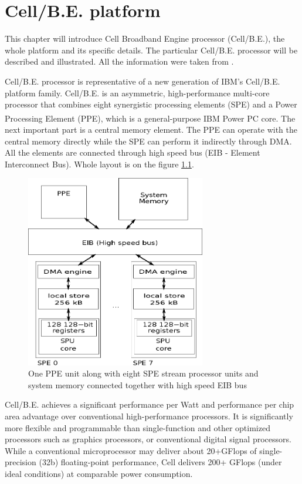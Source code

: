 \chapter{Cell/B.E. platform}

This chapter will introduce Cell Broadband Engine processor (Cell/B.E.), the whole platform and its specific details.
The particular Cell/B.E. processor will be described and illustrated.
All the information were taken from \cite{cbeCenter}.

\par
Cell/B.E. processor is representative of a new generation of IBM's Cell/B.E. platform family.
Cell/B.E. is an asymmetric, high-performance multi-core processor that combines eight synergistic processing elements (SPE) and a Power Processing Element (PPE), which is a general-purpose IBM Power PC\textsuperscript{\textregistered} core.
The next important part is a central memory element.
The PPE can operate with the central memory directly while the SPE can perform it indirectly through DMA.
All the elements are connected through high speed bus (EIB - Element Interconnect Bus).
Whole layout is on the figure \ref{fg:processorLayout}.

\begin{figure}
    \centering
    \includegraphics[width=0.7\textwidth]{data/cellLayout}
    \caption[Cell/B.E. processor layout]{One PPE unit along with eight SPE stream processor units and system memory connected together with high speed EIB bus}
    \label{fg:processorLayout}
\end{figure}

Cell/B.E. achieves a significant performance per Watt and performance per chip area advantage over conventional high-performance processors.
It is significantly more flexible and programmable than single-function and other optimized processors such as graphics processors, or conventional digital signal processors.
While a conventional microprocessor may deliver about 20+GFlops of single-precision (32b) floating-point performance, Cell delivers 200+ GFlops (under ideal conditions) at comparable power consumption.

